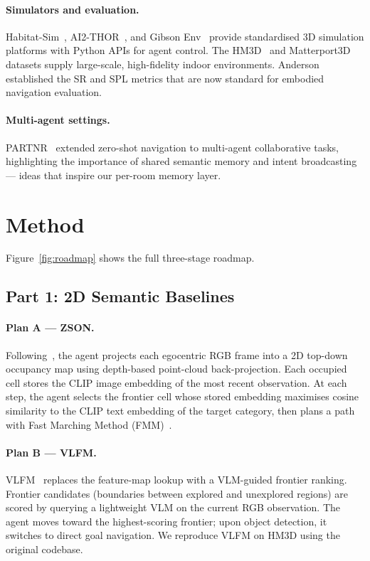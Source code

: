 \documentclass[10pt,twocolumn,letterpaper]{article}
\begin{document}
\paragraph{Simulators and evaluation.}
Habitat-Sim~\cite{savva2019habitat}, AI2-THOR~\cite{kolve2017ai2thor}, and
Gibson Env~\cite{xia2018gibson} provide standardised 3D simulation platforms
with Python APIs for agent control.
The HM3D~\cite{ramakrishnan2021hm3d} and Matterport3D~\cite{chang2017matterport3d}
datasets supply large-scale, high-fidelity indoor environments.
Anderson~\etal~\cite{anderson2018evaluation} established the SR and SPL
metrics that are now standard for embodied navigation evaluation.

\paragraph{Multi-agent settings.}
PARTNR~\cite{chang2024partnr} extended zero-shot navigation to multi-agent
collaborative tasks, highlighting the importance of shared semantic memory
and intent broadcasting --- ideas that inspire our per-room memory layer.

\section{Method}

Figure~\ref{fig:roadmap} shows the full three-stage roadmap.

\subsection{Part 1: 2D Semantic Baselines}

\paragraph{Plan A --- ZSON.}
Following~\cite{majumdar2022zson}, the agent projects each egocentric RGB
frame into a 2D top-down occupancy map using depth-based point-cloud
back-projection.
Each occupied cell stores the CLIP image embedding of the most recent
observation.
At each step, the agent selects the frontier cell whose stored embedding
maximises cosine similarity to the CLIP text embedding of the target
category, then plans a path with Fast Marching Method
(FMM)~\cite{anderson2018evaluation}.

\paragraph{Plan B --- VLFM.}
VLFM~\cite{yokoyama2024vlfm} replaces the feature-map lookup with a
VLM-guided frontier ranking.
Frontier candidates (boundaries between explored and unexplored regions)
are scored by querying a lightweight VLM on the current RGB observation.
The agent moves toward the highest-scoring frontier; upon object detection,
it switches to direct goal navigation.
We reproduce VLFM on HM3D using the original codebase.
\end{document}
